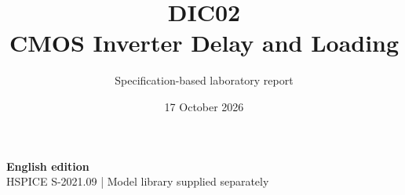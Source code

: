 \documentclass[11pt,a4paper]{article}
\title{\color{accent}DIC02\\[4pt]CMOS Inverter Delay and Loading}
\author{Specification-based laboratory report}
\date{17 October 2026}
\begin{document}
\maketitle
\begin{center}\small\textbf{English edition}\\
HSPICE S-2021.09 \quad | \quad Model library supplied separately
\end{center}


\end{document}

